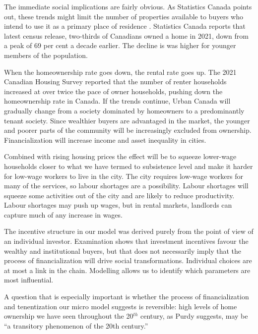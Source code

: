 The immediate social implications are fairly obvious. As Statistics Canada points out, these trends might limit the number of properties available to buyers who intend to use it as a primary place of residence  \cite{fontaineResidentialRealEstate2023}. Statistics Canada reports that latest census release, two-thirds of Canadians owned a home in 2021, down from a peak of 69 per cent a decade earlier. The decline is was higher for younger members of the population. 

When the homeownership rate goes down, the rental rate goes up. The 2021 Canadian Housing Survey reported that the number of renter households increased  at over twice the pace of owner households, pushing down the homeownership rate in Canada. If the trends continue, Urban Canada will gradually change from a society dominated by homeowners to a predominantly tenant society. Since wealthier buyers are advantaged in the market, the younger and poorer parts of the community will be increasingly excluded from ownership. Financialization will increase income and asset inequality in cities.

Combined with rising housing prices the effect will be to squeeze lower-wage households closer to what we have termed to subsistence level and make it harder for low-wage workers to live in the city. The city requires low-wage workers for many of the services, so labour shortages are a possibility. Labour shortages will squeeze some activities out of the city and are likely to reduce productivity. Labour shortages may push up wages, but in rental markets, landlords can capture much of any increase in wages. 

The incentive structure in our model was derived purely from the point of view of an individual investor. Examination shows that investment incentives favour the wealthy and institutional buyers, but that does not necessarily imply that the process of financialization will drive social transformations. Individual choices are at most  a link in the chain. Modelling  allows us to identify which parameters are most influential. 

A question that is especially important is whether the process of financialization and tenentization our micro model suggests is reversible:  high levels of home ownership we have seen throughout the 20$^{th}$ century, as Purdy \cite{purdyPropertyOwningDemocracyHome1993} suggests, may be ``a transitory phenomenon of the 20th century.''


